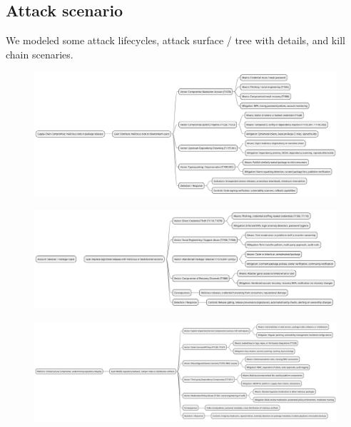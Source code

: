 \documentclass[letterpaper,12pt]{report}
\begin{document}
\subsection{Attack scenario}
We modeled some attack lifecycles, attack surface / tree with details, and kill chain scenaries.

\begin{figure}[htpb!]
    \centering
    \includegraphics[width=1\textwidth]{figure_7}
    \caption[Attack scenario 1]
    \label{fig:figure7}
\end{figure}

\begin{figure}[htpb!]
    \centering
    \includegraphics[width=1\textwidth]{figure_8}
    \caption[Attack scenario 2]
    \label{fig:figure8}
\end{figure}

\begin{figure}[htpb!]
    \centering
    \includegraphics[width=1\textwidth]{figure_9}
    \caption[Attack scenario 3]
    \label{fig:figure9}
\end{figure}
\end{document}
